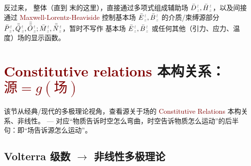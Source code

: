 反过来， 整体（直到  末的这里），直接通过多项式组成辅助场 $\bar{D}^{\;\!\mathcolor{gray}{t}}_{\;\!\mathcolor{gray}{z}}, \bar{H}^{\;\!\mathcolor{gray}{t}}_{\;\!\mathcolor{gray}{z}}$，以及间接通过 \textcolor{Maroon}{Maxwell-Lorentz-Heaviside}  控制基本场 $\bar{E}^{\;\!\mathcolor{gray}{t}}_{\;\!\mathcolor{gray}{z}}, \bar{B}^{\;\!\mathcolor{gray}{t}}_{\;\!\mathcolor{gray}{z}}$ 的介质/束缚源部分 $\bar{P}^{\;\!\mathcolor{gray}{t}}_{\;\!\mathcolor{gray}{z}},\bar{\bar{Q}}^{\;\!\mathcolor{gray}{t}}_{\;\!\mathcolor{gray}{z}},\bar{\bar{\bar{O}}}^{\;\!\mathcolor{gray}{t}}_{\;\!\mathcolor{gray}{z}} ; \bar{M}^{\;\!\mathcolor{gray}{t}}_{\;\!\mathcolor{gray}{z}}, \bar{\bar{N}}^{\;\!\mathcolor{gray}{t}}_{\;\!\mathcolor{gray}{z}}$，暂时不写作 基本场 $\bar{E}^{\;\!\mathcolor{gray}{t}}_{\;\!\mathcolor{gray}{z}}, \bar{B}^{\;\!\mathcolor{gray}{t}}_{\;\!\mathcolor{gray}{z}}$ 或任何其他（引力、应力、温度）场的显示函数。

\section{\textcolor{Maroon}{Constitutive relations} 本构关系：\textcolor{Maroon}{$\text{源} = g(\text{场})$}}\label{sec:constitutive}

该节从经典/现代的多极理论视角，查看源关于场的 \textcolor{Maroon}{Constitutive Relations} 本构关系、非线性。 --- 对应“物质告诉时空怎么弯曲，时空告诉物质怎么运动”的后半句：即“场告诉源怎么运动”。

\vspace*{-4.0em}

\subsection{Volterra 级数 $\longrightarrow$ 非线性多极理论}\label{ssec:PMQN-nonlinear}

